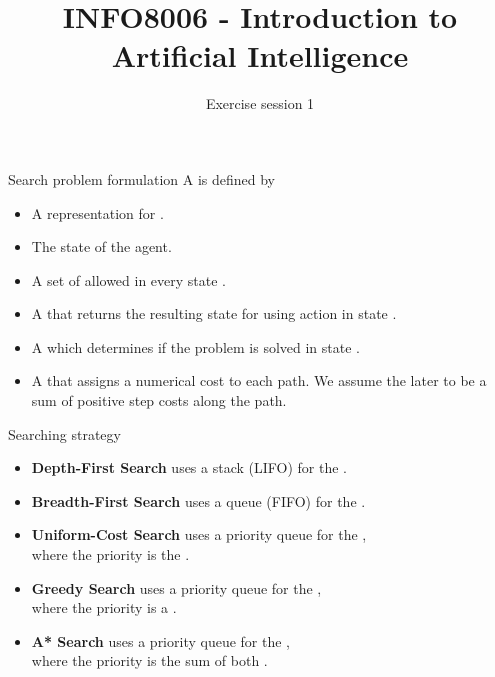 \documentclass[11pt, a4paper]{article}
\title{INFO8006 - Introduction to Artificial Intelligence}
\subtitle{Exercise session 1}
\begin{document}
\maketitle

\begin{thbox}{Search problem formulation}
    A  is defined by    
    \begin{itemize}
        \item A representation for .
        \item The  state of the agent.
        \item A set of  allowed in every state .
        \item A  that returns the resulting state  for using action  in state . 
        \item A  which determines if the problem is solved in state .
        \item A  that assigns a numerical cost to each path. We assume the later to be a sum of positive step costs  along the path. 
    \end{itemize}
\end{thbox}

\begin{thbox}{Searching strategy}
\begin{itemize}[leftmargin=*]
    \item \textbf{Depth-First Search} uses a stack (LIFO) for the .
    \item \textbf{Breadth-First Search} uses a queue (FIFO) for the .
    \item \textbf{Uniform-Cost Search} uses a priority queue for the ,\\where the priority is the .
    \item \textbf{Greedy Search} uses a priority queue for the ,\\where the priority is a .
    \item \textbf{A* Search} uses a priority queue for the ,\\where the priority is the sum of both .
\end{itemize}
\end{thbox}
\end{document}
